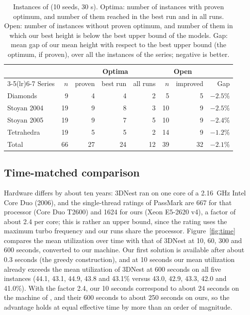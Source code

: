 \documentclass[preprint,12pt,authoryear]{elsarticle}
\begin{document}
\begin{table}[!tbp]
\centering\small
\caption{Instances of \citet{tollenaere2026} (10 seeds, 30 s). Optima: number of instances with proven optimum,
and number of them reached in the best run and in all runs. Open: number of instances without proven optimum, and
number of them in which our best height is below the best upper bound of the models. Gap: mean gap of our mean
height with respect to the best upper bound (the optimum, if proven), over all the instances of the series;
negative is better.}
\label{tab:t2025}
\begin{tabular}{lrrrrrrr}
\toprule
& & \multicolumn{3}{c}{Optima} & \multicolumn{2}{c}{Open} & \\
\cmidrule(lr){3-5}\cmidrule(lr){6-7}
Series & $n$ & proven & best run & all runs & $n$ & improved & Gap\\
\midrule
Diamonds & 9 & 4 & 4 & 2 & 5 & 5 & $-2.5\%$\\
Stoyan 2004 & 19 & 9 & 8 & 3 & 10 & 9 & $-2.5\%$\\
Stoyan 2005 & 19 & 9 & 7 & 5 & 10 & 9 & $-2.4\%$\\
Tetrahedra & 19 & 5 & 5 & 2 & 14 & 9 & $-1.2\%$\\
\midrule
Total & 66 & 27 & 24 & 12 & 39 & 32 & $-2.1\%$\\
\bottomrule
\end{tabular}
\end{table}

\subsection{Time-matched comparison}
Hardware differs by about ten years: 3DNest ran on one core of a 2.16~GHz Intel Core Duo (2006), and the
single-thread ratings of PassMark \citep{passmark} are 667 for that processor (Core Duo T2600) and 1624 for ours
(Xeon E5-2620 v4), a factor of about 2.4 per core; this is rather an upper bound, since the rating uses the maximum
turbo frequency and our runs share the processor. Figure~\ref{fig:time} compares the mean utilization over time with that
of 3DNest at 10, 60, 300 and 600 seconds, converted to our machine. Our first solution is available after about 0.3 seconds (the
greedy construction), and at 10 seconds our mean utilization already exceeds the mean utilization
of 3DNest at 600 seconds on all five instances (44.1, 43.1, 44.9, 43.8 and 43.1\% versus 43.0, 42.9, 43.3, 42.0
and 41.0\%). With the factor 2.4, our 10 seconds correspond to about 24 seconds on the machine of
\citet{egeblad2009}, and their 600 seconds to about 250 seconds on ours, so the advantage holds at equal
effective time by more than an order of magnitude.
\end{document}
